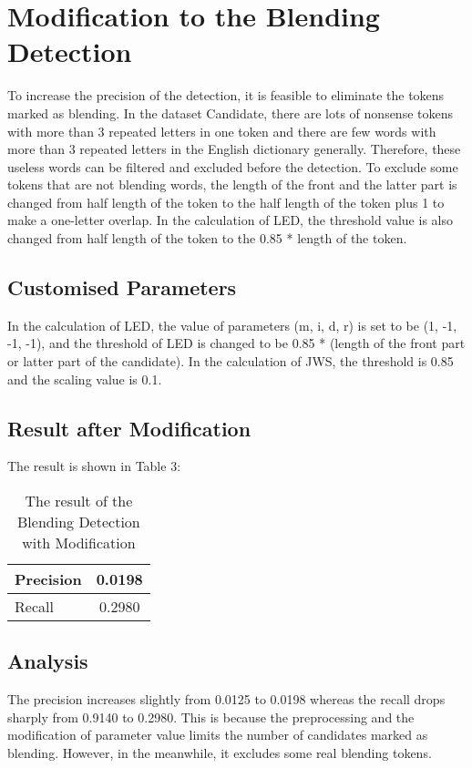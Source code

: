 \documentclass[11pt]{article}
\begin{document}
\section{Modification to the Blending Detection}
To increase the precision of the detection, it is feasible to eliminate the tokens marked as blending. In the dataset Candidate, there are lots of nonsense tokens with more than 3 repeated letters in one token and there are few words with more than 3 repeated letters in the English dictionary generally. Therefore, these useless words can be filtered and excluded before the detection. To exclude some tokens that are not blending words, the length of the front and the latter part is changed from half length of the token to the half length of the token plus 1 to make a one-letter overlap.  In the calculation of LED, the threshold value is also changed from half length of the token to the 0.85 * length of the token. 


\subsection{Customised Parameters}
In the calculation of LED, the value of parameters (m, i, d, r) is set to be (1, -1, -1, -1), and the threshold of LED is changed to be 0.85 * (length of the front part or latter part of the candidate). In the calculation of JWS, the threshold is 0.85 and the scaling value is 0.1.

\subsection{Result after Modification}
The result is shown in Table 3:
\begin{table}[htbp]
 \centering
 \label{table 1}
 
 \begin{tabular}{|l|c|}

  \hline
  Precision & 0.0198\\
  \hline
  Recall & 0.2980\\
  \hline
 
 \end{tabular}

\caption{The result of the Blending Detection with Modification}
\end{table}

\subsection{Analysis}
The precision increases slightly from 0.0125 to 0.0198 whereas the recall drops sharply from 0.9140 to 0.2980. This is because the preprocessing and the modification of parameter value limits the number of candidates marked as blending. However, in the meanwhile, it excludes some real blending tokens.
\end{document}
